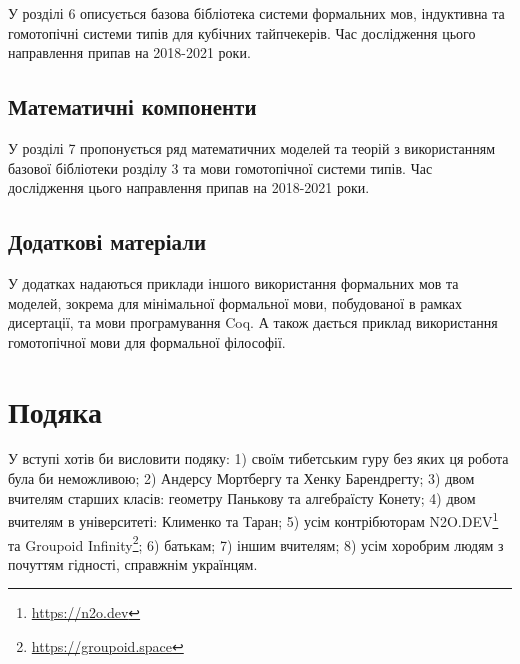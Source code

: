 У розділі 6 описується базова бібліотека системи формальних мов, індуктивна
та гомотопічні системи типів для кубічних тайпчекерів.
Час дослідження цього направлення припав на 2018-2021 роки.

\subsection*{Математичні компоненти}
У розділі 7 пропонується ряд математичних моделей та теорій з використанням
базової бібліотеки розділу 3 та мови гомотопічної системи типів.
Час дослідження цього направлення припав на 2018-2021 роки.

\subsection*{Додаткові матеріали}
У додатках надаються приклади іншого використання формальних мов та моделей,
зокрема для мінімальної формальної мови, побудованої в рамках дисертації,
та мови програмування Coq. А також дається приклад використання
гомотопічної мови для формальної філософії.

\section{Подяка}
У вступі хотів би висловити подяку:
1) своїм тибетським гуру без яких ця робота була би неможливою;
2) Андерсу Мортбергу та Хенку Барендрегту;
3) двом вчителям старших класів: геометру Панькову та алгебраїсту Конету;
4) двом вчителям в університеті: Клименко та Таран;
5) усім контрібюторам N2O.DEV\footnote{\url{https://n2o.dev}} та Groupoid Infinity\footnote{\url{https://groupoid.space}};
6) батькам;
7) іншим вчителям;
8) усім хоробрим людям з почуттям гідності, справжнім українцям.
